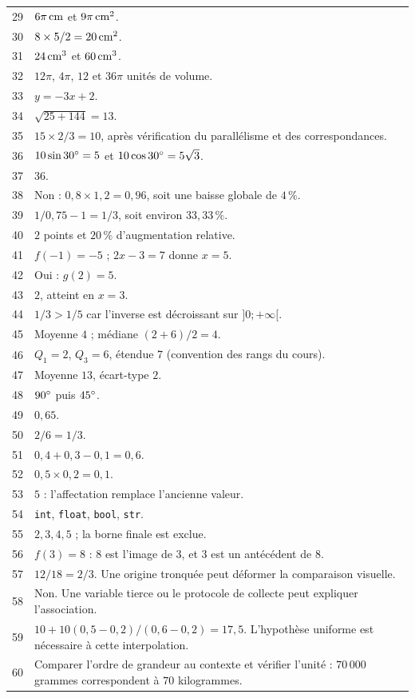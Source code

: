 \documentclass[11pt,a4paper,oneside]{book}
\begin{document}
\begin{longtable}{r p{}}
29 & $6\pi\,\mathrm{cm}$ et $9\pi\,\mathrm{cm^2}$.\\
30 & $8\times5/2=20\,\mathrm{cm^2}$.\\
31 & $24\,\mathrm{cm^3}$ et $60\,\mathrm{cm^3}$.\\
32 & $12\pi$, $4\pi$, $12$ et $36\pi$ unités de volume.\\
33 & $y=-3x+2$.\\
34 & $\sqrt{25+144}=13$.\\
35 & $15\times2/3=10$, après vérification du parallélisme et des correspondances.\\
36 & $10\sin30^{\circ}=5$ et $10\cos30^{\circ}=5\sqrt3$.\\
37 & $36$.\\
38 & Non : $0{,}8\times1{,}2=0{,}96$, soit une baisse globale de $4\,\%$.\\
39 & $1/0{,}75-1=1/3$, soit environ $33{,}33\,\%$.\\
40 & $2$ points et $20\,\%$ d'augmentation relative.\\
41 & $f(-1)=-5$ ; $2x-3=7$ donne $x=5$.\\
42 & Oui : $g(2)=5$.\\
43 & $2$, atteint en $x=3$.\\
44 & $1/3>1/5$ car l'inverse est décroissant sur $]0;+\infty[$.\\
45 & Moyenne $4$ ; médiane $(2+6)/2=4$.\\
46 & $Q_1=2$, $Q_3=6$, étendue $7$ (convention des rangs du cours).\\
47 & Moyenne $13$, écart-type $2$.\\
48 & $90^{\circ}$ puis $45^{\circ}$.\\
49 & $0{,}65$.\\
50 & $2/6=1/3$.\\
51 & $0{,}4+0{,}3-0{,}1=0{,}6$.\\
52 & $0{,}5\times0{,}2=0{,}1$.\\
53 & $5$ : l'affectation remplace l'ancienne valeur.\\
54 & \texttt{int}, \texttt{float}, \texttt{bool}, \texttt{str}.\\
55 & $2,3,4,5$ ; la borne finale est exclue.\\
56 & $f(3)=8$ : $8$ est l'image de $3$, et $3$ est un antécédent de $8$.\\
57 & $12/18=2/3$. Une origine tronquée peut déformer la comparaison visuelle.\\
58 & Non. Une variable tierce ou le protocole de collecte peut expliquer l'association.\\
59 & $10+10(0{,}5-0{,}2)/(0{,}6-0{,}2)=17{,}5$. L'hypothèse uniforme est nécessaire à cette interpolation.\\
60 & Comparer l'ordre de grandeur au contexte et vérifier l'unité : $70\,000$ grammes correspondent à $70$ kilogrammes.\\
\bottomrule\end{longtable}
\end{document}
